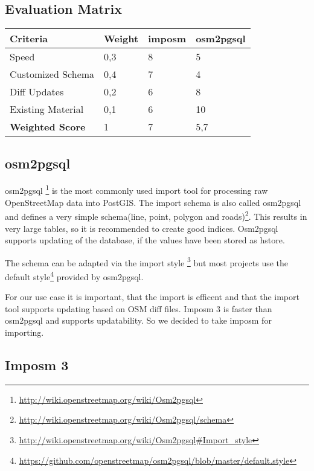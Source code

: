 \subsection{Evaluation Matrix}

\begin{center}
    \begin{tabular}{llll}
    \hline
    Criteria         & Weight & imposm & osm2pgsql \\
    \hline
    Speed             & 0,3    & 8      & 5         \\
    Customized Schema & 0,4    & 7      & 4         \\
    Diff Updates      & 0,2    & 6      & 8         \\
    Existing Material & 0,1    & 6      & 10        \\
    \hline
    \textbf{Weighted Score} & 1      & 7      & 5,7       \\
    \end{tabular}
\end{center}


\subsection{osm2pgsql}\label{osm2pgsql-importer}

osm2pgsql \footnote{\url{http://wiki.openstreetmap.org/wiki/Osm2pgsql}} is the
most commonly used import tool for processing raw OpenStreetMap data into PostGIS.
The import schema is also called osm2pgsql and defines a very
simple schema(line, point, polygon and
roads)\footnote{\url{http://wiki.openstreetmap.org/wiki/Osm2pgsql/schema}}.
This results in very large tables, so it is recommended to create good
indices. Osm2pgsql supports updating of the database, if the values have
been stored as hstore.

The schema can be adapted via the import style \footnote{\url{http://wiki.openstreetmap.org/wiki/Osm2pgsql\#Import_style}}
but most projects use the default style\footnote{\url{https://github.com/openstreetmap/osm2pgsql/blob/master/default.style}} provided by osm2pgsql.

For our use case it is important, that the import is efficent and that
the import tool supports updating based on OSM diff files. Imposm 3 is
faster than osm2pgsql and supports updatability. So we decided to take
imposm for importing.

\subsection{Imposm 3 }\label{imposm-importer}

